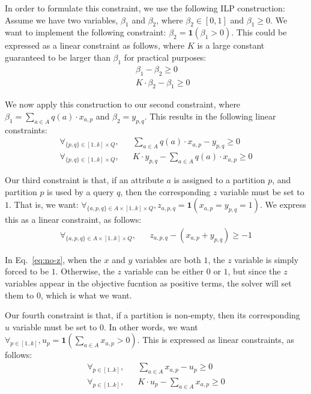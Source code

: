 In order to formulate this constraint, we use the following ILP  construction:
Assume we have two variables, $\beta_1$ and $\beta_2$, where $\beta_2\in[0,1]$
and $\beta_1\geq 0$. We want to implement the following constraint: $\beta_2 =
\mathbf{1}(\beta_1 > 0)$. This could be expressed as a linear constraint as
follows, where $K$ is a large constant guaranteed to be larger than $\beta_1$
for practical purposes:
\begin{eqnarray}
&& \beta_1 - \beta_2 \geq 0\nonumber\\
&& K\cdot\beta_2 - \beta_1 \geq 0\label{eq:beta-ilp}
\end{eqnarray}

We now apply this construction to our second constraint, where
$\beta_1=\sum_{a\in A} q(a)\cdot x_{a,p}$ and $\beta_2=y_{p,q}$. This results
in the following linear constraints:
\begin{eqnarray}
\forall_{\{p,q\}\in [1..k]\times Q}, 
    &&  \sum_{a\in A} q(a)\cdot x_{a,p} - y_{p,q} \geq 0 \nonumber\\
\forall_{\{p,q\}\in [1..k]\times Q}, 
    &&  K\cdot y_{p,q} - \sum_{a\in A} q(a)\cdot x_{a,p}  \geq 0 
\end{eqnarray}

Our third constraint is that, if an attribute $a$ is assigned to a partition
$p$, and partition $p$ is used by a query $q$, then the corresponding $z$
variable must be set to $1$. That is, we want: $\forall_{\{a,p,q\}\in A\times
[1..k]\times Q}, z_{a,p,q}=\mathbf{1}(x_{a,p} = y_{p,q} = 1)$. We express this
as a linear  constraint, as follows:
\begin{eqnarray}
\forall_{\{a,p,q\}\in A\times [1..k]\times Q},
    && z_{a,p,q} - (x_{a,p} + y_{p,q}) \geq -1\label{eq:no-z}
\end{eqnarray}

In Eq.~\ref{eq:no-z}, when the $x$ and $y$ variables are both $1$, the  $z$
variable is simply forced to be $1$. Otherwise, the $z$ variable can be either
$0$ or $1$, but since the $z$ variables appear in the objective fucntion as
positive terms, the solver will set them to $0$, which is what we want. 

Our fourth constraint is that, if a partition is non-empty, then its
corresponding $u$ variable must be set to $0$. In other words,  we want
$\forall_{p\in[1..k]}, u_p = \mathbf{1}(\sum_{a\in A} x_{a,p}>0)$. This is
expressed as linear constraints, as follows:
\begin{eqnarray}
\forall_{p\in[1..k]},
    && \sum_{a\in A} x_{a,p} - u_p \geq 0 \nonumber\\
\forall_{p\in[1..k]},
    && K\cdot u_p - \sum_{a\in A} x_{a,p} \geq 0 \label{eq:no-u}
\end{eqnarray}

